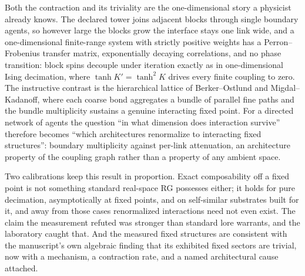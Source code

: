 \documentclass[11pt,letterpaper]{article}
\begin{document}
\begin{physicalreading}
Both the contraction and its triviality are the one-dimensional story a physicist already knows. The declared tower joins adjacent blocks through single boundary agents, so however large the blocks grow the interface stays one link wide, and a one-dimensional finite-range system with strictly positive weights has a Perron--Frobenius transfer matrix, exponentially decaying correlations, and no phase transition: block spins decouple under iteration exactly as in one-dimensional Ising decimation, where $\tanh K' = \tanh^2 K$ drives every finite coupling to zero. The instructive contrast is the hierarchical lattice of Berker--Ostlund and Migdal--Kadanoff, where each coarse bond aggregates a bundle of parallel fine paths and the bundle multiplicity sustains a genuine interacting fixed point. For a directed network of agents the question ``in what dimension does interaction survive'' therefore becomes ``which architectures renormalize to interacting fixed structures'': boundary multiplicity against per-link attenuation, an architecture property of the coupling graph rather than a property of any ambient space.
\end{physicalreading}

Two calibrations keep this result in proportion. Exact composability off a fixed point is not something standard real-space RG possesses either; it holds for pure decimation, asymptotically at fixed points, and on self-similar substrates built for it, and away from those cases renormalized interactions need not even exist. The claim the measurement refuted was stronger than standard lore warrants, and the laboratory caught that. And the measured fixed structures are consistent with the manuscript's own algebraic finding that its exhibited fixed sectors are trivial, now with a mechanism, a contraction rate, and a named architectural cause attached.
\end{document}
